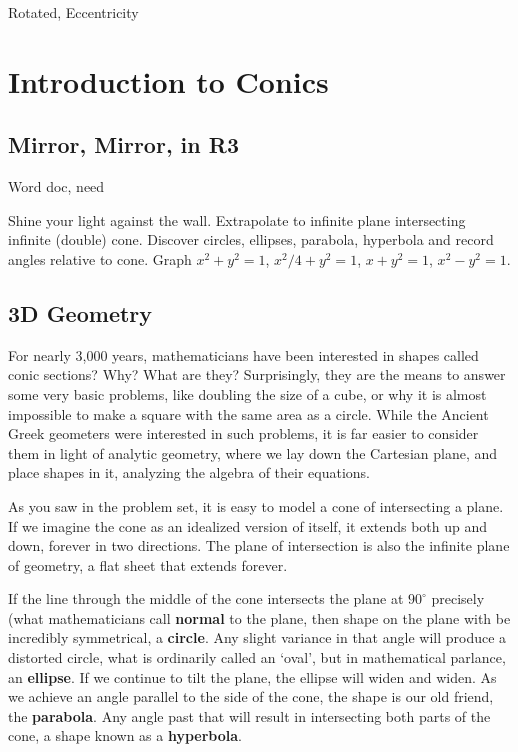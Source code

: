 

Rotated, Eccentricity

\newpage
\chapterminitoc

\newpage
\section{Introduction to Conics}
\subsection{Mirror, Mirror, in R3}
Word doc, need

Shine your light against the wall.  Extrapolate to infinite plane intersecting infinite (double) cone.  Discover circles, ellipses, parabola, hyperbola and record angles relative to cone.  Graph $x^2+y^2=1$, $x^2/4+y^2=1$, $x+y^2=1$, $x^2-y^2=1$.
\newpage
\subsection{3D Geometry}
For nearly 3,000 years, mathematicians have been interested in shapes called
conic sections?  Why?  What are they?  Surprisingly, they are the means to answer some
very basic problems, like doubling the size of a cube, or why it is almost impossible to make
a square with the same area as a circle.  While the Ancient Greek geometers were interested
in such problems, it is far easier to consider them in light of analytic geometry, where we 
lay down the Cartesian plane, and place shapes in it, analyzing the algebra of their equations.

As you saw in the problem set, it is easy to model a cone of intersecting a plane.  If we
imagine the cone as an idealized version of itself, it extends both up and down, forever
in two directions.  The plane of intersection is also the infinite plane of geometry, a flat
sheet that extends forever.

If the line through the middle of the cone intersects the plane at $90^\circ$ precisely
(what mathematicians call \textbf{normal} to the plane, then shape on the plane with
be incredibly symmetrical, a \textbf{circle}.  Any slight variance in that angle will produce a
distorted circle, what is ordinarily called an `oval', but in mathematical parlance, an
\textbf{ellipse}. If we continue to tilt the plane, the ellipse will widen and widen.  As we
achieve an angle parallel to the side of the cone, the shape is our old friend, the 
\textbf{parabola}.  Any angle past that will result in intersecting both parts of the cone,
a shape known as a \textbf{hyperbola}.

